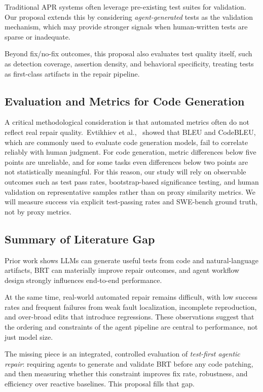 \documentclass[12pt]{article}
\begin{document}
Traditional APR systems often leverage pre-existing test suites for validation. Our proposal extends this by considering \emph{agent-generated} tests as the validation mechanism, which may provide stronger signals when human-written tests are sparse or inadequate.

Beyond fix/no-fix outcomes, this proposal also evaluates test quality itself, such as detection coverage, assertion density, and behavioral specificity, treating tests as first-class artifacts in the repair pipeline.

\subsection{Evaluation and Metrics for Code Generation}

A critical methodological consideration is that automated metrics often do not reflect real repair quality.~Evtikhiev et al.,~\cite{Evtikhiev2023BLEU} showed that BLEU and CodeBLEU, which are commonly used to evaluate code generation models, fail to correlate reliably with human judgment. For code generation, metric differences below five points are unreliable, and for some tasks even differences below two points are not statistically meaningful. For this reason, our study will rely on observable outcomes such as test pass rates, bootstrap-based significance testing, and human validation on representative samples rather than on proxy similarity metrics. We will measure success via explicit test-passing rates and SWE-bench ground truth, not by proxy metrics.

\subsection{Summary of Literature Gap}

Prior work shows LLMs can generate useful tests from code and natural-language artifacts, BRT can materially improve repair outcomes, and agent workflow design strongly influences end-to-end performance.

At the same time, real-world automated repair remains difficult, with low success rates and frequent failures from weak fault localization, incomplete reproduction, and over-broad edits that introduce regressions. These observations suggest that the ordering and constraints of the agent pipeline are central to performance, not just model size.

The missing piece is an integrated, controlled evaluation of \emph{test-first agentic repair}: requiring agents to generate and validate BRT before any code patching, and then measuring whether this constraint improves fix rate, robustness, and efficiency over reactive baselines. This proposal fills that gap.
\end{document}
